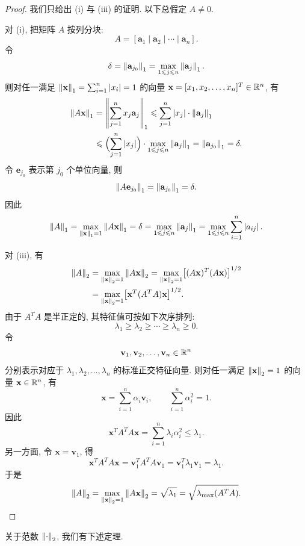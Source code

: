 \begin{proof}
我们只给出 (i) 与 (iii) 的证明. 以下总假定 $A\neq0$.

对 (i), 把矩阵 $A$ 按列分块:
\[
  A=[\mathbf{a}_1\mid\mathbf{a}_2\mid\cdots\mid\mathbf{a}_n].
\]
令
\[
  \delta=\left\|\mathbf{a}_{j_0}\right\|_1=\max_{1\leqslant j\leqslant n}\left\|\mathbf{a}_j\right\|_1.
\]
则对任一满足 $\left\|\mathbf{x}\right\|_1=\sum_{i=1}^{n}|x_i|=1$ 的向量 $\mathbf{x}=[x_1,x_2,\ldots,x_n]^T\in\mathbb{R}^n$, 有
\[
  \begin{aligned}
    \left\|A\mathbf{x}\right\|_1
    &=\left\|\sum_{j=1}^{n}x_j\mathbf{a}_j\right\|_1
      \leqslant\sum_{j=1}^{n}|x_j|\cdot\left\|\mathbf{a}_j\right\|_1\\
    &\leqslant\Bigl(\sum_{j=1}^{n}|x_j|\Bigr)\cdot\max_{1\leqslant j\leqslant n}\left\|\mathbf{a}_j\right\|_1
      =\left\|\mathbf{a}_{j_0}\right\|_1=\delta.
  \end{aligned}
\]
令 $\mathbf{e}_{j_0}$ 表示第 $j_0$ 个单位向量, 则
\[
  \left\|A\mathbf{e}_{j_0}\right\|_1=\left\|\mathbf{a}_{j_0}\right\|_1=\delta.
\]
因此
\[
  \left\|A\right\|_1=\max_{\left\|\mathbf{x}\right\|_1=1}\left\|A\mathbf{x}\right\|_1
  =\delta=\max_{1\leqslant j\leqslant n}\left\|\mathbf{a}_j\right\|_1
  =\max_{1\leqslant j\leqslant n}\sum_{i=1}^{n}\left|a_{ij}\right|.
\]

对 (iii), 有
\[
  \begin{aligned}
    \left\|A\right\|_2
    &=\max_{\left\|\mathbf{x}\right\|_2=1}\left\|A\mathbf{x}\right\|_2
      =\max_{\left\|\mathbf{x}\right\|_2=1}\bigl[(A\mathbf{x})^T(A\mathbf{x})\bigr]^{1/2}\\
    &=\max_{\left\|\mathbf{x}\right\|_2=1}\bigl[\mathbf{x}^T(A^TA)\mathbf{x}\bigr]^{1/2}.
  \end{aligned}
\]
由于 $A^TA$ 是半正定的, 其特征值可按如下次序排列:
\[
  \lambda_1\geqslant\lambda_2\geqslant\cdots\geqslant\lambda_n\geqslant0.
\]
令
\[
  \mathbf{v}_1,\mathbf{v}_2,\ldots,\mathbf{v}_n\in\mathbb{R}^n
\]
分别表示对应于 $\lambda_1,\lambda_2,\ldots,\lambda_n$ 的标准正交特征向量. 则对任一满足 $\left\|\mathbf{x}\right\|_2=1$ 的向量 $\mathbf{x}\in\mathbb{R}^n$, 有
\[
  \mathbf{x}=\sum_{i=1}^{n}\alpha_i\mathbf{v}_i,\qquad\sum_{i=1}^{n}\alpha_i^2=1.
\]
因此
\[
  \mathbf{x}^TA^TA\mathbf{x}=\sum_{i=1}^{n}\lambda_i\alpha_i^2\leqslant\lambda_1.
\]
另一方面, 令 $\mathbf{x}=\mathbf{v}_1$, 得
\[
  \mathbf{x}^TA^TA\mathbf{x}=\mathbf{v}_1^TA^TA\mathbf{v}_1
  =\mathbf{v}_1^T\lambda_1\mathbf{v}_1=\lambda_1.
\]
于是
\[
  \left\|A\right\|_2=\max_{\left\|\mathbf{x}\right\|_2=1}\left\|A\mathbf{x}\right\|_2
  =\sqrt{\lambda_1}=\sqrt{\lambda_{\max}(A^TA)}.
\]
\end{proof}

关于范数 $\left\|\cdot\right\|_2$, 我们有下述定理.

